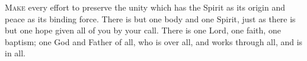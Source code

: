 \lettrine[lines=3,loversize=0.15]{M}{ake} every effort to preserve the unity which has the Spirit as its origin and peace as its binding force. There is but one body and one Spirit, just as there is but one hope given all of you by your call. There is one Lord, one faith, one baptism; one God and Father of all, who is over all, and works through all, and is in all.
